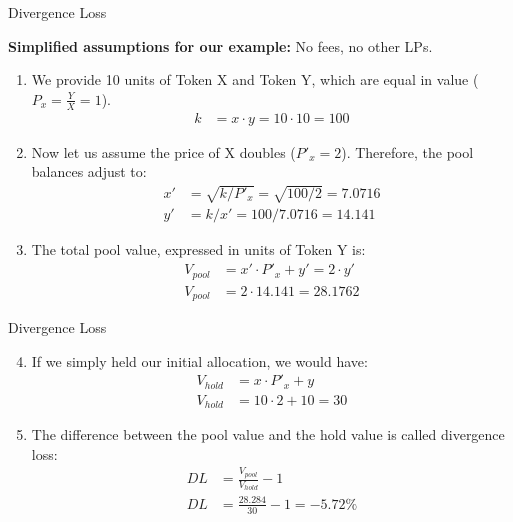 \documentclass[handout]{beamer}
\begin{document}
\begin{frame}{Divergence Loss}

	\textbf{Simplified assumptions for our example:} No fees, no other LPs. \\ 
		\begin{enumerate}
			\item<2-> We provide 10 units of Token X and Token Y, which are equal in value ($P_x = \tfrac{Y}{X} = 1$).
				\begin{align*}
					k &= x \cdot y = 10 \cdot 10 = 100	
				\end{align*}
			\item<3-> Now let us assume the price of X doubles ($P'_x = 2$). Therefore, the pool balances adjust to:
				\begin{align*}
					x' &= \sqrt{k/P'_{x}}	 = \sqrt{100/2} = 7.0716\\
					y' &= k / x' = 100 / 7.0716 = 14.141
				\end{align*}
			\item<4-> The total pool value, expressed in units of Token Y is: 
				\begin{align*}
					V_{pool} &= x' \cdot P'_x + y' = 2 \cdot y'\\
					V_{pool} &= 2 \cdot 14.141 = 28.1762
				\end{align*}
		\end{enumerate}	
\end{frame}


\begin{frame}{Divergence Loss}

	\begin{enumerate}
	\setcounter{enumi}{3}
		\item<1-> If we simply held our initial allocation, we would have:
			\begin{align*}
				V_{hold} &= x \cdot P'_x + y\\
				V_{hold} &= 10 \cdot 2 + 10 = 30
			\end{align*}
		\item<2-> The difference between the pool value and the hold value is called divergence loss:
			\begin{align*}
				DL &= \tfrac{V_{pool}}{V_{hold}} - 1\\
				DL &= \tfrac{28.284}{30} - 1 = -5.72 \%
			\end{align*}
	\end{enumerate}	
	
	
\end{frame}
\end{document}
